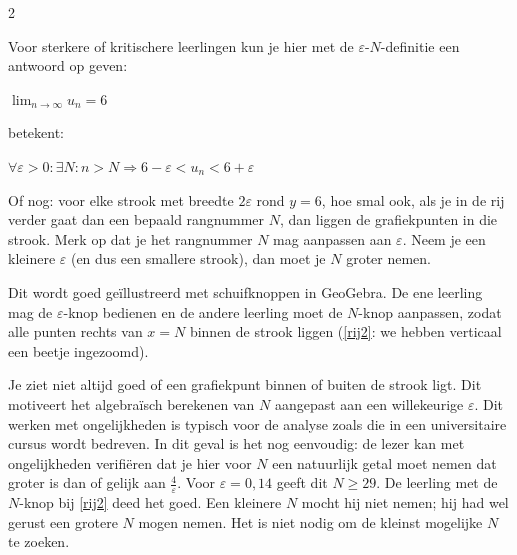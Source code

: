 \begin{multicols}{2}

Voor sterkere of kritischere leerlingen kun je hier met de $\varepsilon$-$N$-definitie een antwoord op geven:

$\lim_{n \rightarrow \infty}{u_n}=6$

betekent:

$\forall \varepsilon >0:\exists N: n>N \Rightarrow 6-\varepsilon<u_n<6+\varepsilon$

Of nog: voor elke strook met breedte $2\varepsilon$ rond $y=6$, hoe smal ook, als je in de rij verder gaat dan een bepaald rangnummer $N$, dan liggen de grafiekpunten in die strook. Merk op dat je het rangnummer $N$ mag aanpassen aan $\varepsilon$. Neem je een kleinere $\varepsilon$ (en dus een smallere strook), dan moet je $N$ groter nemen.

Dit wordt goed geïllustreerd met schuifknoppen in GeoGebra. De ene leerling mag de $\varepsilon$-knop bedienen en de andere leerling moet de $N$-knop aanpassen, zodat alle punten rechts van $x=N$ binnen de strook liggen (\autoref{rij2}: we hebben verticaal een beetje ingezoomd).

Je ziet niet altijd goed of een grafiekpunt binnen of buiten de strook ligt. Dit motiveert het algebraïsch berekenen van $N$ aangepast aan een willekeurige $\varepsilon$. Dit werken met ongelijkheden is typisch voor de analyse zoals die in een universitaire cursus wordt bedreven. In dit geval is het nog eenvoudig: de lezer kan met ongelijkheden verifiëren dat je hier voor $N$ een natuurlijk getal moet nemen dat groter is dan of gelijk aan $\frac{4}{\varepsilon}$. Voor $\varepsilon=0,14$ geeft dit $N \geq 29$. De leerling met de $N$-knop bij \autoref{rij2} deed het goed. Een kleinere $N$ mocht hij niet nemen; hij had wel gerust een grotere $N$ mogen nemen. Het is niet nodig om de kleinst mogelijke $N$ te zoeken.
\end{multicols}
	
